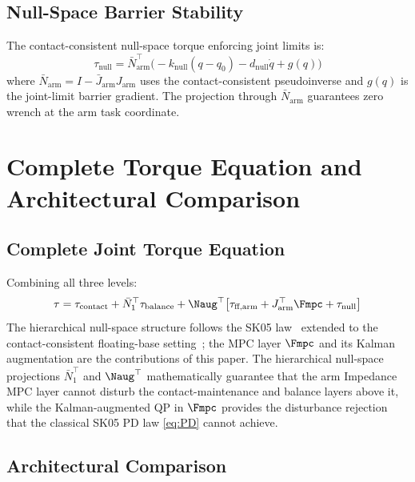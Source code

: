 \subsection{Null-Space Barrier Stability}

The contact-consistent null-space torque enforcing joint limits is:
\begin{equation}\label{eq:null}
  \tau_{\text{null}}
    = \bar{N}_{\text{arm}}^\top\bigl(-k_{\text{null}}(q-q_0)
      -d_{\text{null}}\dot{q}+g(q)\bigr)
\end{equation}
where $\bar{N}_{\text{arm}}=I-\bar{J}_{\text{arm}}J_{\text{arm}}$ uses the
contact-consistent pseudoinverse and $g(q)$ is the joint-limit barrier
gradient.
The projection through $\bar{N}_{\text{arm}}$ guarantees zero wrench at the
arm task coordinate.

\section{Complete Torque Equation and Architectural Comparison}
\label{sec:torque}

\subsection{Complete Joint Torque Equation}

Combining all three levels:
\begin{equation}\label{eq:fulltorque}
  \tau = \tau_{\text{contact}}
       + \bar{N}_1^\top\tau_{\text{balance}}
       + \Naug^\top\bigl[\tau_{\text{ff,arm}}
         + J_{\text{arm}}^\top\Fmpc + \tau_{\text{null}}\bigr]
\end{equation}
The hierarchical null-space structure follows the SK05
law~\cite{sentis2005synthesis} extended to the contact-consistent
floating-base setting~\cite{khatib1987unified,righetti2011inverse}; the MPC
layer $\Fmpc$ and its Kalman augmentation are the contributions of this
paper. The hierarchical null-space projections $\bar{N}_1^\top$ and
$\Naug^\top$ mathematically guarantee that the arm Impedance MPC layer
cannot disturb the contact-maintenance and balance layers above it, while
the Kalman-augmented QP in $\Fmpc$ provides the disturbance rejection that
the classical SK05 PD law \eqref{eq:PD} cannot achieve.

\subsection{Architectural Comparison}\label{sec:comparison}

